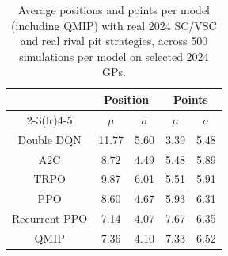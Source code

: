 \begin{table}[H]
\centering
\begin{tabular}{ccccc}
\toprule
\multicolumn{1}{l}{}               & \multicolumn{2}{c}{Position}   & \multicolumn{2}{c}{Points} \\ \cmidrule(lr){2-3}\cmidrule(lr){4-5}
\multicolumn{1}{c}{Model}          &    $\mu$ & $\sigma$ &   $\mu$  & $\sigma$ \\ \midrule
\multicolumn{1}{c}{Double DQN    } &    11.77  &     5.60  &     3.39  &     5.48  \\
\multicolumn{1}{c}{A2C           } &     8.72  &     4.49  &     5.48  &     5.89  \\
\multicolumn{1}{c}{TRPO          } &     9.87  &     6.01  &     5.51  &     5.91  \\
\multicolumn{1}{c}{PPO           } &     8.60  &     4.67  &     5.93  &     6.31  \\
\multicolumn{1}{c}{Recurrent PPO } &     7.14  &     4.07  &     7.67  &     6.35  \\
\multicolumn{1}{c}{QMIP          } &     7.36  &     4.10  &     7.33  &     6.52  \\
\bottomrule
\end{tabular}
\caption{Average positions and points per model (including QMIP) with real 2024 SC/VSC and real rival pit strategies, across 500 simulations per model on selected 2024 GPs.}
\label{tab:tab_all_gps_2024_with_qmip}
\end{table}